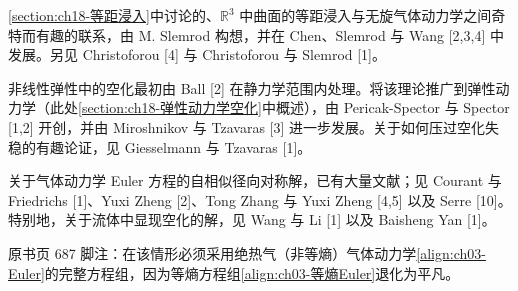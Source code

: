 \documentclass[../../main.tex]{subfiles}
\begin{document}
\cref{section:ch18-等距浸入}中讨论的、$\mathbb{R}^3$ 中曲面的等距浸入与无旋气体动力学之间奇特而有趣的联系，由 M. Slemrod 构想，并在 Chen、Slemrod 与 Wang [2,3,4] 中发展。另见 Christoforou [4] 与 Christoforou 与 Slemrod [1]。

非线性弹性中的空化最初由 Ball [2] 在静力学范围内处理。将该理论推广到弹性动力学（此处\cref{section:ch18-弹性动力学空化}中概述），由 Pericak-Spector 与 Spector [1,2] 开创，并由 Miroshnikov 与 Tzavaras [3] 进一步发展。关于如何压过空化失稳的有趣论证，见 Giesselmann 与 Tzavaras [1]。

关于气体动力学 Euler 方程的自相似径向对称解，已有大量文献；见 Courant 与 Friedrichs [1]、Yuxi Zheng [2]、Tong Zhang 与 Yuxi Zheng [4,5] 以及 Serre [10]。特别地，关于流体中显现空化的解，见 Wang 与 Li [1] 以及 Baisheng Yan [1]。

\medskip
\noindent\footnotesize 原书页 687 脚注：在该情形必须采用绝热气（非等熵）气体动力学\eqref{align:ch03-Euler}的完整方程组，因为等熵方程组\eqref{align:ch03-等熵Euler}退化为平凡。
\end{document}
